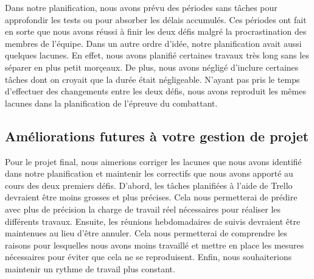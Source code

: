 \begin{spacing}{1.5}
    Dans notre planification, nous avons prévu des périodes sans tâches pour approfondir les tests ou pour absorber les délais accumulés.
    Ces périodes ont fait en sorte que nous avons réussi à finir les deux défis malgré la procrastination des membres de l'équipe.
    Dans un autre ordre d'idée, notre planification avait aussi quelques lacunes.
    En effet, nous avons planifié certaines travaux très long sans les séparer en plus petit morçeaux.
    De plus, nous avons négligé d'inclure certaines tâches dont on croyait que la durée était négligeable.
    N'ayant pas pris le temps d'effectuer des changements entre les deux défis, nous avons reproduit les mêmes lacunes dans la planification de l'épreuve du combattant.
\end{spacing}

\subsection{Améliorations futures à votre gestion de projet}

\begin{spacing}{1.5}
    Pour le projet final, nous aimerions corriger les lacunes que nous avons identifié dans notre planification et maintenir les correctifs que nous avons apporté au cours des deux premiers défis.
    D'abord, les tâches planifiées à l'aide de Trello devraient être moins grosses et plus précises. Cela nous permetterai de prédire avec plus de précision la charge de travail réel nécessaires pour réaliser les différents travaux.
    Ensuite, les réunions hebdomadaires de suivis devraient être maintenues au lieu d'être annuler. Cela nous permetterai de comprendre les raisons pour lesquelles nous avons moins travaillé et mettre en place les mesures nécessaires pour éviter que cela ne se reproduisent.
    Enfin, nous souhaiterions maintenir un rythme de travail plus constant.
\end{spacing}

